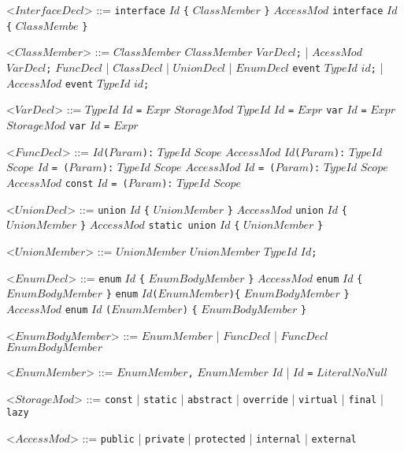 \documentclass{article}
\newcommand{\gtext}[1]{<$#1$>}
\newcommand{\glit}[1]{\texttt{#1}}
\begin{document}
\begin{grammar}
	\gtext{InterfaceDecl} ::= \glit{interface} $Id$ \glit{\{} $ClassMember$ \glit{\}}
	\alt $AccessMod$ \glit{interface} $Id$ \glit{\{} $ClassMembe$ \glit{\}}
	
	\gtext{ClassMember} ::= $ClassMember$ $ClassMember$
	\alt $VarDecl$\glit{;} | $AcessMod$ $VarDecl$\glit{;}
	\alt $FuncDecl$ | $ClassDecl$ | $UnionDecl$ | $EnumDecl$
	\alt \glit{event} $TypeId$ $id$\glit{;} | $AccessMod$ \glit{event} $TypeId$ $id$\glit{;}
	
	\gtext{VarDecl} ::= $TypeId$ $Id$ \glit{=} $Expr$
	\alt $StorageMod$ $TypeId$ $Id$ \glit{=} $Expr$
	\alt \glit{var} $Id$ \glit{=} $Expr$
	\alt $StorageMod$ \glit{var} $Id$ \glit{=} $Expr$

	\newpage	
	
	\gtext{FuncDecl} ::=  $Id$\glit{(}$Param$\glit{):} $TypeId$ $Scope$ %
	\alt $AccessMod$ $Id$\glit{(}$Param$\glit{):} $TypeId$ $Scope$ %
	\alt $Id$ \glit{= (}$Param$\glit{):} $TypeId$ $Scope$  %
	\alt $AccessMod$ $Id$ \glit{= (}$Param$\glit{):} $TypeId$ $Scope$  %
	\alt $AccessMod$ \glit{const} $Id$ \glit{= (}$Param$\glit{):} $TypeId$ $Scope$  %
	
	\gtext{UnionDecl} ::= \glit{union} $Id$ \glit{\{} $UnionMember$ \glit{\}}
	\alt $AccessMod$ \glit{union} $Id$ \glit{\{} $UnionMember$ \glit{\}}
	\alt $AccessMod$ \glit{static union} $Id$ \glit{\{} $UnionMember$ \glit{\}}
	
	\gtext{UnionMember} ::= $UnionMember$ $UnionMember$
	\alt $TypeId$ $Id$\glit{;}	
	
	\gtext{EnumDecl} ::= \glit{enum} $Id$ \glit{\{} $EnumBodyMember$ \glit{\}}
	\alt $AccessMod$ \glit{enum} $Id$ \glit{\{} $EnumBodyMember$ \glit{\}}
	\alt \glit{enum} $Id$\glit{(}$EnumMember$\glit{)\{} $EnumBodyMember$ \glit{\}}
	\alt $AccessMod$ \glit{enum} $Id$ \glit{(}$EnumMember$\glit{)} \glit{\{} $EnumBodyMember$ \glit{\}}
	
	\gtext{EnumBodyMember} ::= $EnumMember$ | $FuncDecl$ | $FuncDecl$ $EnumBodyMember$
	
	\gtext{EnumMember} ::=  $EnumMember$\glit{,} $EnumMember$
	\alt $Id$ | $Id$ \glit{=} $LiteralNoNull$
	
	\gtext{StorageMod} ::= \glit{const} | \glit{static} | \glit{abstract} | \glit{override} | \glit{virtual} | \glit{final} | \glit{lazy}
	
	\gtext{AccessMod} ::= \glit{public} | \glit{private} | \glit{protected} | \glit{internal} | \glit{external}
	

\end{grammar}
\end{document}
